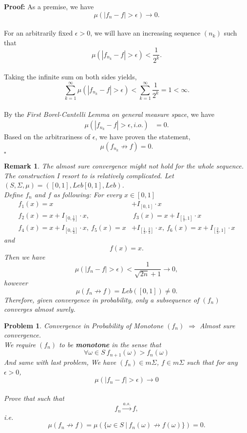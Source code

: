 \documentclass[UTF8, 12pt]{article}
\newenvironment{proof}{\noindent\ignorespaces\textbf{Proof:}}{\hfill $\square$\par\noindent}
\newtheorem{problem}{Problem}
\newtheorem*{remark*}{Remark}
\begin{document}
    \text{}

    \begin{proof}
        As a premise, we have $$ \mu(|f_n-f| > \epsilon) \to 0. $$ \\
        For an arbitrarily fixed $\epsilon > 0$, we will have an increasing sequence $(n_k)$ such that
        $$ \mu(|f_{n_k} - f| > \epsilon) < \frac{1}{2^k}.$$ \\
        Taking the infinite sum on both sides yields, $$ \sum_{k=1}^{\infty} \mu(|f_{n_k} - f| > \epsilon) < \sum_{k=1}^{\infty} \frac{1}{2^k} = 1 < \infty .$$ \\
        By the \textit{First Borel-Cantelli Lemma on general measure space}, we have
        \begin{align*}
            \mu(|f_{n_k} - f| > \epsilon, i.o.) &= 0.
        \end{align*}
        Based on the arbitrariness of $\epsilon$, we have proven the statement, $$ \mu(f_{n_k} \not\rightarrow f) = 0 .$$
    \end{proof}

    \begin{remark*}
        The almost sure convergence might not hold for the whole sequence. \\
        The construction I resort to is relatively complicated. Let $(S,\Sigma, \mu) = ([0,1], Leb[0,1], Leb)$. \\
        Define $f_n$ and $f$ as following: For every $x \in [0,1]$
        \begin{align*}
            f_1(x) = x &+ I_{[0,1]} \cdot x \\
            f_2(x) = x + I_{[0,\frac{1}{2}]} \cdot x ,&~ f_3(x) = x + I_{[\frac{1}{2}, 1]} \cdot x \\
            f_4(x) = x + I_{[0,\frac{1}{3}]} \cdot x, ~ f_5(x) = x &+ I_{[\frac{1}{3}, \frac{2}{3}]} \cdot x, ~ f_6(x) = x + I_{[\frac{2}{3}, 1]} \cdot x
        \end{align*}
        and $$ f(x) = x. $$
        Then we have $$ \mu(|f_n-f| > \epsilon) < \frac{1}{\sqrt{2n} + 1} \to 0, $$
        however $$ \mu(f_n \not\rightarrow f) = Leb([0,1]) \neq 0. $$
        Therefore, given convergence in probability, only a subsequence of $(f_n)$ converges almost surely.
    \end{remark*}
    
    \text{}

    \begin{problem}
        Convergence in Probability of Monotone $(f_n)$ $\Longrightarrow$ Almost sure convergence. \\
        We require $(f_n)$ to be \textbf{monotone} in the sense that $$ \forall \omega \in S\ f_{n+1}(\omega) > f_n(\omega) $$
        And same with last problem, We have $(f_n) \in m\Sigma$, $f \in m\Sigma$ such that for any $\epsilon > 0$, $$ \mu(|f_n-f| > \epsilon) \to 0 $$ \\
        Prove that such that $$ f_{n} \overset{a.s.}{\longrightarrow} f ,$$ 
        i.e. $$ \mu(f_{n} \not\rightarrow f) = \mu(\{\omega\in S \ |\ f_{n}(\omega) \not\rightarrow f(\omega)\}) = 0 .$$ 
    \end{problem}
\end{document}
